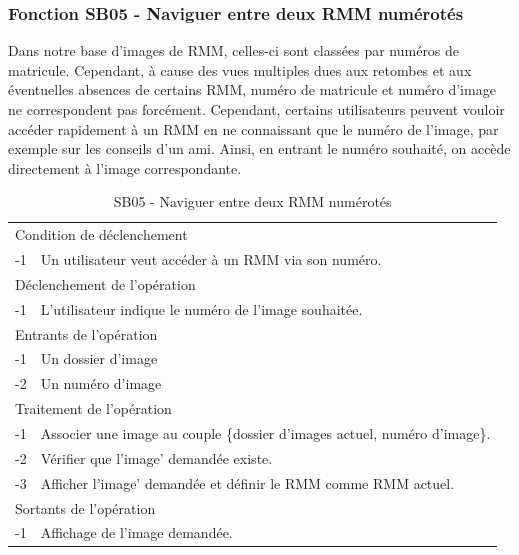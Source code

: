 \documentclass[a4paper]{article}
\begin{document}
\subsubsection{Fonction SB05 - Naviguer entre deux RMM numérotés}

Dans notre base d'images de RMM, celles-ci sont classées par numéros de matricule. Cependant, à cause des vues multiples dues aux retombes et aux éventuelles absences de certains RMM, numéro de matricule et numéro d'image ne correspondent pas forcément. Cependant, certains utilisateurs peuvent vouloir accéder rapidement à un RMM en ne connaissant que le numéro de l'image, par exemple sur les conseils d'un ami. Ainsi, en entrant le numéro souhaité, on accède directement à l'image correspondante.

\begin{table}[H]
  \centering
   \small
  \begin{tabular}{|c|p{12cm}|}
      \hline
        \rowcolor{lightgray}\multicolumn{2}{|c|}{\textbf{SB05 - Naviguer entre deux RMM numérotés}} \\
      \hline
        \multicolumn{2}{|l|}{Condition de d\'eclenchement} \\
      \hline
      -1 & Un utilisateur veut acc\'eder \`a un RMM via son numéro. \\
      \hline
        \multicolumn{2}{|l|}{D\'eclenchement de l'op\'eration} \\
      \hline
        -1 & L'utilisateur indique le numéro de l'image souhaitée. \\
      \hline
        \multicolumn{2}{|l|}{Entrants de l'op\'eration} \\
      \hline
        -1 & Un dossier d'image \\
          -2 & Un numéro d'image \\ 
      \hline
        \multicolumn{2}{|l|}{Traitement de l'op\'eration} \\
      \hline
        -1 & Associer une image au couple \{dossier d'images actuel, numéro d'image\}.  \\
          -2 & V\'erifier que l'image' demand\'ee existe. \\
          -3 & Afficher l'image' demand\'ee et définir le RMM comme RMM actuel. \\
      \hline
        \multicolumn{2}{|l|}{Sortants de l'op\'eration} \\
      \hline
        -1 & Affichage de l'image demand\'ee. \\
      \hline
  \end{tabular}
  \caption{SB05 - Naviguer entre deux RMM numérotés}
  \normalsize
  \label{tab:naviguer_deux_registres_numerotes}
\end{table}
\end{document}
